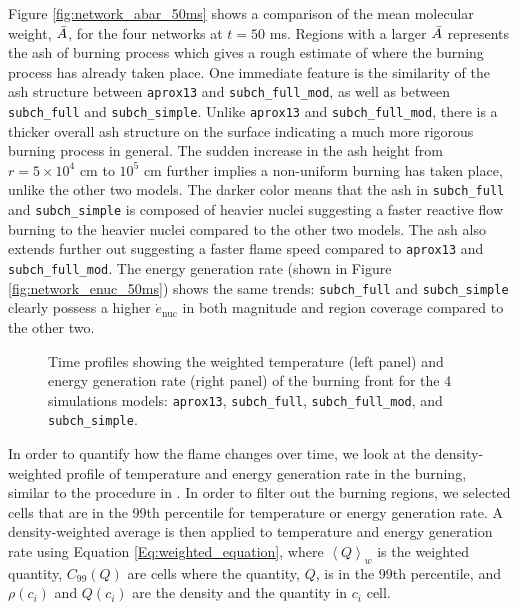 \documentclass[preprint,times,tighten]{aastex631}
\begin{document}
Figure \ref{fig:network_abar_50ms} shows a comparison of the mean molecular weight, $\Bar{A}$, for the four networks at $t = 50$ ms. Regions with a larger $\Bar{A}$ represents the ash of burning process which gives a rough estimate of where the burning process has already taken place. One immediate feature is the similarity of the ash structure between {\tt aprox13} and {\tt subch\_full\_mod}, as well as between {\tt subch\_full} and {\tt subch\_simple}. Unlike {\tt aprox13} and {\tt subch\_full\_mod}, there is a thicker overall ash structure on the surface indicating a much more rigorous burning process in general. The sudden increase in the ash height from $r = 5 \times 10^4$ cm to $10^5$ cm further implies a non-uniform burning has taken place, unlike the other two models. The darker color means that the ash in {\tt subch\_full} and {\tt subch\_simple} is composed of heavier nuclei suggesting a faster reactive flow burning to the heavier nuclei compared to the other two models. The ash also extends further out suggesting a faster flame speed compared to {\tt aprox13} and {\tt subch\_full\_mod}. 
The energy generation rate (shown in Figure \ref{fig:network_enuc_50ms}) shows the same trends: {\tt subch\_full} and {\tt subch\_simple} clearly possess a higher $\dot{e}_{\textrm{nuc}}$ in both magnitude and region coverage compared to the other two. 


\begin{figure*}
\centering
{}
\caption{\label{fig:network_time_profile} Time profiles showing the weighted temperature (left panel) and energy generation rate (right panel) of the burning front for the 4 simulations models: {\tt aprox13}, {\tt subch\_full}, {\tt subch\_full\_mod}, and {\tt subch\_simple}.}
\end{figure*}
 
In order to quantify how the flame changes over time, we look at the
density-weighted profile of temperature and energy generation rate in the burning, similar to the procedure in \citet{harpole:2021}. 
In order to filter out the burning regions, we selected cells that are in the 99th percentile for temperature or energy generation rate. A density-weighted average is then applied to temperature and energy generation rate using Equation \ref{Eq:weighted_equation}, where $\left<Q\right>_w$ is the weighted quantity, $C_{99}(Q)$ are cells where the quantity, $Q$, is in the 99th percentile, and $\rho(c_i)$ and $Q(c_i)$ are the density and the quantity in $c_i$ cell.
\end{document}
